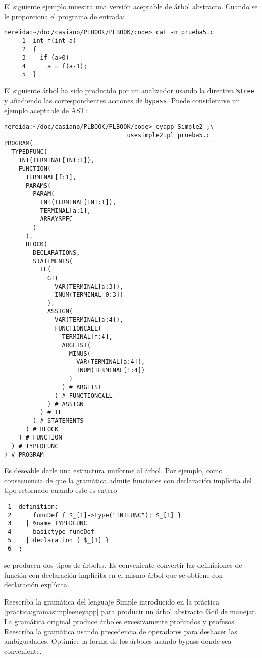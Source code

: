 \begin{enumerate}
El siguiente ejemplo muestra una versión aceptable de árbol abstracto.
Cuando se le proporciona el programa de entrada:

\begin{verbatim}
nereida:~/doc/casiano/PLBOOK/PLBOOK/code> cat -n prueba5.c
     1  int f(int a)
     2  {
     3    if (a>0)
     4      a = f(a-1);
     5  }
\end{verbatim}


El siguiente árbol ha sido producido por un analizador usando la directiva 
\verb|%tree| y añadiendo las correspondientes acciones de \verb|bypass|.
Puede considerarse un ejemplo aceptable de AST:

\begin{verbatim}
nereida:~/doc/casiano/PLBOOK/PLBOOK/code> eyapp Simple2 ;\
                                  usesimple2.pl prueba5.c
PROGRAM(
  TYPEDFUNC(
    INT(TERMINAL[INT:1]),
    FUNCTION(
      TERMINAL[f:1],
      PARAMS(
        PARAM(
          INT(TERMINAL[INT:1]),
          TERMINAL[a:1],
          ARRAYSPEC
        )
      ),
      BLOCK(
        DECLARATIONS,
        STATEMENTS(
          IF(
            GT(
              VAR(TERMINAL[a:3]),
              INUM(TERMINAL[0:3])
            ),
            ASSIGN(
              VAR(TERMINAL[a:4]),
              FUNCTIONCALL(
                TERMINAL[f:4],
                ARGLIST(
                  MINUS(
                    VAR(TERMINAL[a:4]),
                    INUM(TERMINAL[1:4])
                  )
                ) # ARGLIST
              ) # FUNCTIONCALL
            ) # ASSIGN
          ) # IF
        ) # STATEMENTS
      ) # BLOCK
    ) # FUNCTION
  ) # TYPEDFUNC
) # PROGRAM
\end{verbatim}

Es deseable  darle una estructura uniforme al árbol. Por ejemplo, como consecuencia 
de que la gramática admite funciones con declaración implícita del tipo
retornado cuando este es entero

\begin{verbatim}
 1  definition:
 2      funcDef { $_[1]->type("INTFUNC"); $_[1] }
 3    | %name TYPEDFUNC
 4      basictype funcDef
 5    | declaration { $_[1] }
 6  ;
\end{verbatim}
\end{enumerate}

se producen dos tipos de árboles. Es conveniente
convertir las definiciones de función con declaración 
implícita en el mismo árbol que se obtiene con 
declaración explícita. 


\label{practica:construcciondelarbolparaellenguajesimple}
Reescriba la gramática del lenguaje Simple introducido 
en la práctica
\ref{practica:gramasimpleeneyapp} para producir un árbol abstracto
fácil de manejar. La gramática original produce árboles excesivamente 
profundos y profusos. Reescriba la gramática
usando precedencia de operadores para deshacer las ambiguedades.
Optimice la forma de los árboles usando bypass donde sea 
conveniente.

